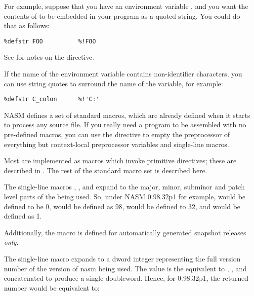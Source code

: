 For example, suppose that you have an environment variable ,
and you want the contents of  to be embedded in your program as
a quoted string. You could do that as follows:

\begin{lstlisting}
%defstr FOO          %!FOO
\end{lstlisting}

See  for notes on the  directive.

If the name of the environment variable contains non-identifier
characters, you can use string quotes to surround the name of the
variable, for example:

\begin{lstlisting}
%defstr C_colon      %!'C:'
\end{lstlisting}


NASM defines a set of standard macros, which are already defined
when it starts to process any source file. If you really need a
program to be assembled with no pre-defined macros, you can use the
 directive to empty the preprocessor of everything
but context-local preprocessor variables and single-line macros.

Most  are implemented as macros
which invoke primitive directives; these are described in .
The rest of the standard macro set is described here.


The single-line macros , ,
 and  expand to
the major, minor, subminor and patch level parts of the 
being used. So, under NASM 0.98.32p1 for example, 
would be defined to be 0,  would be defined as 98,
 would be defined to 32, and 
would be defined as 1.

Additionally, the macro  is defined for
automatically generated snapshot releases \emph{only}.


The single-line macro  expands to a dword integer
representing the full version number of the version of nasm being used.
The value is the equivalent to , ,
 and  concatenated to
produce a single doubleword. Hence, for 0.98.32p1, the returned number
would be equivalent to:

